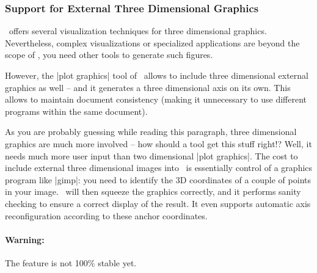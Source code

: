 {
	
\iffalse
\subsubsection*{Support for External Three Dimensional Graphics}
\PGFPlots\ offers several visualization techniques for three dimensional graphics. Nevertheless, complex visualizations or specialized applications are beyond the scope of \PGFPlots, you need other tools to generate such figures. 

However, the |plot graphics| tool of \PGFPlots\ allows to include three dimensional external graphics as well -- and it generates a three dimensional axis on its own. This allows to maintain document consistency (making it unnecessary to use different programs within the same document). 

As you are probably guessing while reading this paragraph, three dimensional graphics are much more involved -- how should a tool get this stuff right!? Well, it needs much more user input than two dimensional |plot graphics|. The cost to include external three dimensional images into \PGFPlots\ is essentially control of a graphics program like |gimp|: you need to identify the 3D coordinates of a couple of points in your image. \PGFPlots\ will then squeeze the graphics correctly, and it performs sanity checking to ensure a correct display of the result. It even supports automatic axis reconfiguration according to these anchor coordinates.

\paragraph{Warning:} The feature is not 100\% stable yet.

}
